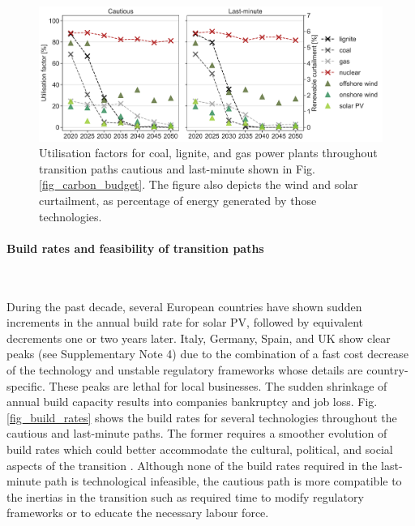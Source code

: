 \documentclass[5p]{elsarticle} %
\begin{document}
\begin{figure}[!h]
\centering
\includegraphics[width=\columnwidth]{figures/utilisation_factors.png}
\caption{Utilisation factors for coal, lignite, and gas power plants throughout transition paths cautious and last-minute shown in Fig. \ref{fig_carbon_budget}. The figure also depicts the wind and solar curtailment, as percentage of energy generated by those technologies. } \label{fig_utilisation_factors} 
\end{figure}




\paragraph{\textbf{Build rates and feasibility of transition paths}} \

During the past decade, several European countries have shown sudden increments in the annual build rate for solar PV, followed by equivalent decrements one or two years later. Italy, Germany, Spain, and UK show clear peaks (see Supplementary Note 4)  due to the combination of a fast cost decrease of the technology and unstable regulatory frameworks whose details are country-specific. These peaks are lethal for local businesses. The sudden shrinkage of annual build capacity results into companies bankruptcy and job loss. Fig. \ref{fig_build_rates}  shows the build rates for several technologies throughout the cautious and last-minute paths. The former requires a smoother evolution of build rates which could better accommodate the cultural, political, and social aspects of the transition \cite{Geels_2017}. Although none of the build rates required in the last-minute path is technological infeasible, the cautious path is more compatible to the inertias in the transition such as required time to modify regulatory frameworks or to educate the necessary labour force. 
\end{document}
